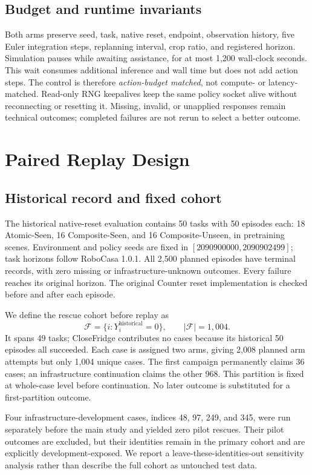 \documentclass[10pt,twocolumn,letterpaper]{article}
\newcommand{\N}{1{,}004}
\newcommand{\F}{\mathcal F}
\begin{document}
\subsection{Budget and runtime invariants}
Both arms preserve seed, task, native reset, endpoint, observation history, five Euler integration steps, replanning interval, crop ratio, and registered horizon. Simulation pauses while awaiting assistance, for at most 1,200 wall-clock seconds. This wait consumes additional inference and wall time but does not add action steps. The control is therefore \emph{action-budget matched}, not compute- or latency-matched. Read-only RNG keepalives keep the same policy socket alive without reconnecting or resetting it. Missing, invalid, or unapplied responses remain technical outcomes; completed failures are not rerun to select a better outcome.

\section{Paired Replay Design}
\label{sec:design}
\subsection{Historical record and fixed cohort}
The historical native-reset evaluation contains 50 tasks with 50 episodes each: 18 Atomic-Seen, 16 Composite-Seen, and 16 Composite-Unseen, in pretraining scenes. Environment and policy seeds are fixed in $[2090900000,2090902499]$; task horizons follow RoboCasa 1.0.1. All 2,500 planned episodes have terminal records, with zero missing or infrastructure-unknown outcomes. Every failure reaches its original horizon. The original Counter reset implementation is checked before and after each episode.

We define the rescue cohort before replay as
\begin{equation}
\F=\{i:Y_i^{\mathrm{historical}}=0\},\qquad |\F|=\N.
\end{equation}
It spans 49 tasks; CloseFridge contributes no cases because its historical 50 episodes all succeeded. Each case is assigned two arms, giving 2,008 planned arm attempts but only 1,004 unique cases. The first campaign permanently claims 36 cases; an infrastructure continuation claims the other 968. This partition is fixed at whole-case level before continuation. No later outcome is substituted for a first-partition outcome.

Four infrastructure-development cases, indices 48, 97, 249, and 345, were run separately before the main study and yielded zero pilot rescues. Their pilot outcomes are excluded, but their identities remain in the primary cohort and are explicitly development-exposed. We report a leave-these-identities-out sensitivity analysis rather than describe the full cohort as untouched test data.
\end{document}
